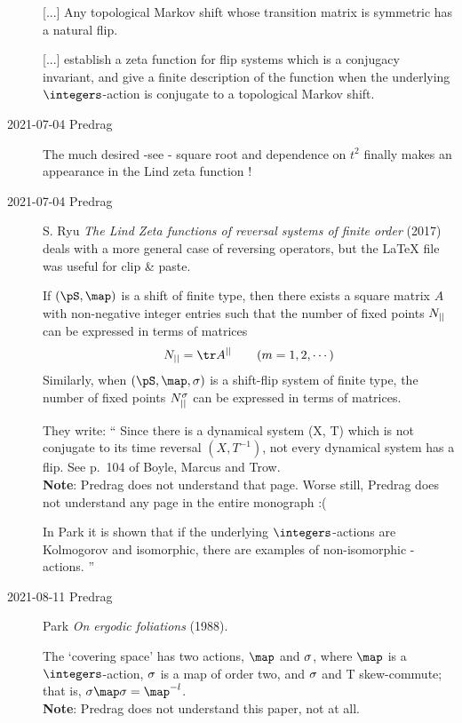 \begin{description}
[...]
Any topological Markov shift whose transition matrix is symmetric has a
natural flip.

[...]
establish a zeta function for flip systems which is a conjugacy invariant,
and give a finite description of the function when the underlying
$\integers$-action is conjugate to a topological Markov shift.

\item[2021-07-04 Predrag]
The much desired -see - square root and
dependence on $t^2$ finally makes an
appearance in the Lind zeta function !

\item[2021-07-04 Predrag]
S. Ryu {\em The Lind Zeta functions of reversal systems of finite order}
 (2017) deals with a more general case of reversing operators,
but the LaTeX file was useful for clip \& paste.

If $(\pS,\map)$ is a shift of finite type, then there exists a square matrix
$A$ with non-negative integer entries such that the number of fixed points
$N_{||}$ can be expressed in terms of matrices
\begin{equation}\label{Ryu17eq:2.2}
N_\cl{} = \tr A^\cl{} \qquad (m = 1, 2, \cdots)
\end{equation}
Similarly, when $(\pS,\map,\Refl)$ is a shift-flip system of finite type, the
number of fixed points $N^{\sigma}_{||}$ can be expressed in terms of
matrices. %

They write:
``
Since there is a dynamical system (X, T) which is not conjugate to its
time reversal $(X, T^{-1})$, not every dynamical system has a flip. See
p.~104 of Boyle, Marcus and Trow.
\\
\textbf{Note}: Predrag does not understand that page. Worse still,
Predrag does not understand any page in the entire monograph :(

In Park it is shown that if the underlying $\integers$-actions
are Kolmogorov and isomorphic, there are examples of non-isomorphic
\Dn{\infty}-actions.
''

\item[2021-08-11 Predrag]
Park {\em On ergodic foliations} (1988).

The `covering space' has two actions, $\map$ and $\sigma$, where $\map$ is
a $\integers$-action, $\sigma$ is a map of order two, and $\sigma$ and T
skew-commute; that is, $\Refl\map\Refl = \map^{-l}$.
\\
\textbf{Note}: Predrag does not understand this paper, not at all.


\end{description}
